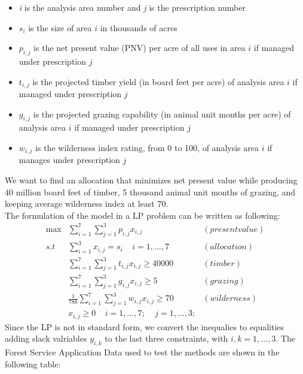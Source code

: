 \documentclass[a4paper,10 pt,titlepage,twoside]{book}
\theoremstyle{plain}
\theoremstyle{definition}
\theoremstyle{remark}
\begin{document}
\begin{itemize}
	\item \textit{i} is the analysis area number and \textit{j} is the prescription number
	\item $s_{i}$ is the size of area $i$ in thousands of acres
	\item $p_{i,j}$ is the net present value (PNV) per acre of all uses in area $i$ if managed under prescription $j$
	\item $t_{i,j}$ is the projected timber yield (in board feet per acre) of analysis area $i$ if managed under prescription $j$
	\item $g_{i,j}$ is the projected grazing capability (in animal unit months per acre) of analysis area $i$ if managed under prescription $j$
	\item $w_{i,j}$ is the wilderness index rating, from 0 to 100, of analysis area $i$ if manages under prescription $j$
\end{itemize}
We want to find an allocation that minimizes net present value while producing 40 million board feet of timber, 5 thousand animal unit months of grazing, and keeping average wilderness index at least 70.\\
The formulation of the model in a LP problem can be written as following:
\begin{align*}
\max&\sum_{i=1}^{7}\sum_{j=1}^{3} p_{i,j}x_{i,j}&(present value)\\
s.t& \sum_{i=1}^{3}x_{i,j}=s_{i}\;\;\;\;i = 1, \dots,7&(allocation)\\
&\sum_{i=1}^{7}\sum_{j=1}^{3} t_{i,j}x_{i,j}\geq 40000&(timber)\\
&\sum_{i=1}^{7}\sum_{j=1}^{3} g_{i,j}x_{i,j}\geq5&(grazing)\\
&\frac{1}{788}\sum_{i=1}^{7}\sum_{j=1}^{3} w_{i,j}x_{i,j}\geq 70&(wilderness)\\
&x_{i,j}\geq 0 \;\;\;\;i = 1,\dots,7;\;\;\;\;j = 1,\dots,3;
\end{align*}
Since the LP is not in standard form, we convert the inequalies to equalities adding slack valriables $y_{i,k}$ to the last three constraints, with $i, k = 1, \dots, 3$. The Forest Service Application Data used to test the methods are shown in the following table:\\
\end{document}
